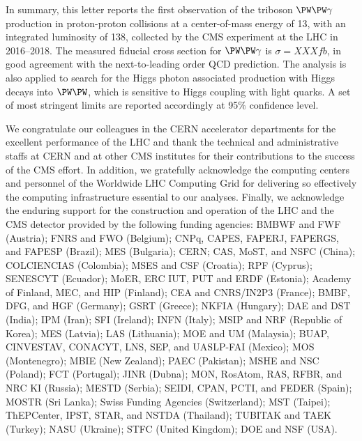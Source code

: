 In summary, this letter reports the first observation of the triboson $\PW\PW\gamma$ production in proton-proton collisions at a center-of-mass energy of 13\TeV, with an integrated luminosity of 138\fbinv, collected by the CMS experiment at the LHC in 2016--2018. The measured fiducial cross section for $\PW\PW\gamma$ is $\sigma=XXX\unit{fb}$, in good agreement with the next-to-leading order QCD prediction. 
The analysis is also applied to search for the Higgs photon associated production with Higgs decays into $\PW\PW$, which is sensitive to Higgs coupling with light quarks. A set of most stringent limits are reported accordingly at 95\% confidence level.

\begin{acknowledgments}
We congratulate our colleagues in the CERN accelerator departments for the excellent performance of the LHC and thank the technical and administrative staffs at CERN and at other CMS institutes for their contributions to the success of the CMS effort. In addition, we gratefully acknowledge the computing centers and personnel of the Worldwide LHC Computing Grid for delivering so effectively the computing infrastructure essential to our analyses. Finally, we acknowledge the enduring support for the construction and operation of the LHC and the CMS detector provided by the following funding agencies: BMBWF and FWF (Austria); FNRS and FWO (Belgium); CNPq, CAPES, FAPERJ, FAPERGS, and FAPESP (Brazil); MES (Bulgaria); CERN; CAS, MoST, and NSFC (China); COLCIENCIAS (Colombia); MSES and CSF (Croatia); RPF (Cyprus); SENESCYT (Ecuador); MoER, ERC IUT, PUT and ERDF (Estonia); Academy of Finland, MEC, and HIP (Finland); CEA and CNRS/IN2P3 (France); BMBF, DFG, and HGF (Germany); GSRT (Greece); NKFIA (Hungary); DAE and DST (India); IPM (Iran); SFI (Ireland); INFN (Italy); MSIP and NRF (Republic of Korea); MES (Latvia); LAS (Lithuania); MOE and UM (Malaysia); BUAP, CINVESTAV, CONACYT, LNS, SEP, and UASLP-FAI (Mexico); MOS (Montenegro); MBIE (New Zealand); PAEC (Pakistan); MSHE and NSC (Poland); FCT (Portugal); JINR (Dubna); MON, RosAtom, RAS, RFBR, and NRC KI (Russia); MESTD (Serbia); SEIDI, CPAN, PCTI, and FEDER (Spain); MOSTR (Sri Lanka); Swiss Funding Agencies (Switzerland); MST (Taipei); ThEPCenter, IPST, STAR, and NSTDA (Thailand); TUBITAK and TAEK (Turkey); NASU (Ukraine); STFC (United Kingdom); DOE and NSF (USA). 
\end{acknowledgments}


